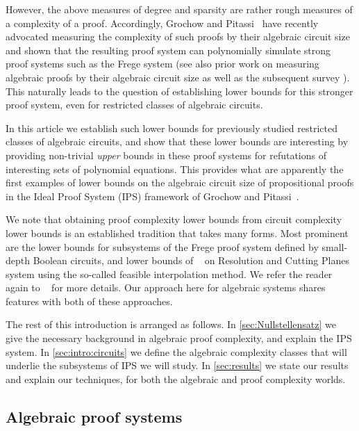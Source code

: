 \documentclass{toc}
\begin{document}
However, the above measures of degree and sparsity are rather rough measures of a complexity of a proof. Accordingly,
Grochow and Pitassi~\cite{DBLP:journals/jacm/GrochowP18} have recently advocated measuring the complexity of such proofs by their algebraic circuit size and shown that the resulting proof system can polynomially simulate strong proof systems such as the Frege system (see also prior work on measuring algebraic proofs by their algebraic circuit size \cite{Pitassi97,GrigorievHirsch03,RazTzameret08a,RazTzameret08b,Tzameret11} as well as the subsequent survey \cite{PitassiT16}). %
%
 This naturally leads to the question of establishing lower bounds for this stronger proof system, even for restricted classes of algebraic circuits.

In this article
we establish such lower bounds for previously studied restricted classes of algebraic circuits, and show that these lower bounds are interesting by providing non-trivial \emph{upper} bounds in these proof systems for refutations of interesting sets of polynomial equations.  This provides what are apparently the first examples of lower bounds on the algebraic circuit size of propositional proofs in the Ideal Proof System (IPS) framework of Grochow and Pitassi~\cite{DBLP:journals/jacm/GrochowP18}.

We note that obtaining proof complexity lower bounds from circuit complexity lower bounds is an established tradition that takes many forms. Most prominent are the lower bounds for subsystems of the Frege proof system defined by small-depth Boolean circuits, and lower bounds of \Pudlak~\cite{Pudlak97} on Resolution and Cutting Planes system using the so-called feasible interpolation method.  We refer the reader again to \Krajicek~\cite{Krajicek95} for more details. Our approach here for algebraic systems shares features with both of these approaches.

The rest of this introduction is arranged as follows. In \autoref{sec:Nullstellensatz} we give the necessary background in algebraic proof complexity, and explain the IPS system. In \autoref{sec:intro:circuits} we define the algebraic complexity classes that will underlie the subsystems of IPS we will study. In \autoref{sec:results} we state our results and explain our techniques, for both the algebraic and proof complexity worlds.

\subsection{Algebraic proof systems}\label{sec:Nullstellensatz}
\end{document}
